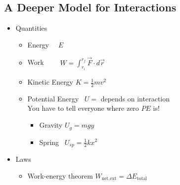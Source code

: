 \documentclass[]{article}
\begin{document}
\begin{PresentSpace}
\vspace{-10pt}
\section*{A Deeper Model for Interactions}
\vspace{-10pt}
\begin{itemize}
	\item Quantities
	\begin{itemize}
		\item Energy \qquad \qquad \qquad \quad \ \ $E$
		\item Work \qquad \qquad \qquad \quad \ \ \ \ $W = \int_{r_{i}}^{r_{f}}\vec{F}\cdot d\vec{r}$
		\item Kinetic Energy \qquad \qquad $K=\frac{1}{2}mv^{2}$
		\item Potential Energy \qquad \quad \ $U=$ depends on interaction \\
		You have to tell everyone where zero $PE$ is!
		\begin{itemize}
			\item Gravity \qquad $U_{g} = mgy$
			\item Spring \qquad \ $U_{sp} = \frac{1}{2}kx^{2}$
		\end{itemize}
	\end{itemize}
	\item Laws
	\begin{itemize}
		\item Work-energy theorem \quad $W_{\text{net,ext}} = \Delta E_{\text{total}}$
	\end{itemize}
\end{itemize}
\end{PresentSpace}
\newpage
\end{document}
